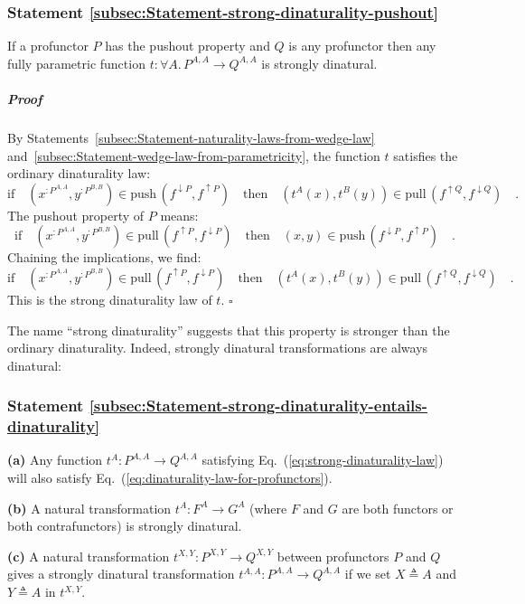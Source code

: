 \subsubsection{Statement \label{subsec:Statement-strong-dinaturality-pushout}\ref{subsec:Statement-strong-dinaturality-pushout}}

If a profunctor $P$ has the pushout property and $Q$ is any profunctor
then any fully parametric function $t:\forall A.\,P^{A,A}\rightarrow Q^{A,A}$
is strongly dinatural.

\subparagraph{Proof}

By Statements~\ref{subsec:Statement-naturality-laws-from-wedge-law}
and~\ref{subsec:Statement-wedge-law-from-parametricity}, the function
$t$ satisfies the ordinary dinaturality law:
\[
\text{if}\quad(x^{:P^{A,A}},y^{:P^{B,B}})\in\text{push}\,(f^{\downarrow P},f^{\uparrow P})\quad\text{then}\quad(t^{A}(x),t^{B}(y))\in\text{pull}\,(f^{\uparrow Q},f^{\downarrow Q})\quad.
\]
The pushout property of $P$ means:
\[
\text{if}\quad(x^{:P^{A,A}},y^{:P^{B,B}})\in\text{pull}\,(f^{\uparrow P},f^{\downarrow P})\quad\text{then}\quad(x,y)\in\text{push}\,(f^{\downarrow P},f^{\uparrow P})\quad.
\]
Chaining the implications, we find:
\[
\text{if}\quad(x^{:P^{A,A}},y^{:P^{B,B}})\in\text{pull}\,(f^{\uparrow P},f^{\downarrow P})\quad\text{then}\quad(t^{A}(x),t^{B}(y))\in\text{pull}\,(f^{\uparrow Q},f^{\downarrow Q})\quad.
\]
This is the strong dinaturality law of $t$. $\square$

The name \textsf{``}strong dinaturality\textsf{''} suggests that this property is
stronger than the ordinary dinaturality. Indeed, strongly dinatural
transformations are always dinatural:

\subsubsection{Statement \label{subsec:Statement-strong-dinaturality-entails-dinaturality}\ref{subsec:Statement-strong-dinaturality-entails-dinaturality}}

\textbf{(a)} Any function $t^{A}:P^{A,A}\rightarrow Q^{A,A}$ satisfying
Eq.~(\ref{eq:strong-dinaturality-law}) will also satisfy Eq.~(\ref{eq:dinaturality-law-for-profunctors}).

\textbf{(b)} A natural transformation $t^{A}:F^{A}\rightarrow G^{A}$
(where $F$ and $G$ are both functors or both contrafunctors) is
strongly dinatural.

\textbf{(c)} A natural transformation $t^{X,Y}:P^{X,Y}\rightarrow Q^{X,Y}$
between profunctors $P$ and $Q$ gives a strongly dinatural transformation
$t^{A,A}:P^{A,A}\rightarrow Q^{A,A}$ if we set $X\triangleq A$ and
$Y\triangleq A$ in $t^{X,Y}$.

